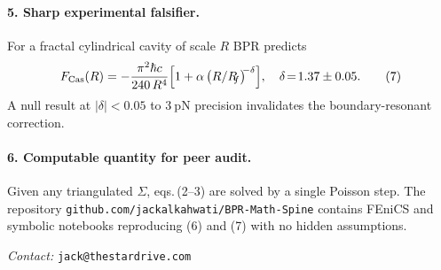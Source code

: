 \documentclass[11pt]{article}
\begin{document}
\paragraph{5. Sharp experimental falsifier.}
For a fractal cylindrical cavity of scale $R$ BPR predicts
\[
  F_{\text{Cas}}(R)
    = -\frac{\pi^2\hbar c}{240\,R^4}
      \Bigl[1+\alpha\,\bigl(R/R_{\!\!f}\bigr)^{\!\!-\delta}\Bigr],
  \quad\delta\!=\!1.37\pm0.05.                                     \tag{7}
\]
A null result at $|\delta|<0.05$ to $\SI{3}{\pico\newton}$ precision
invalidates the boundary-resonant correction.

\paragraph{6. Computable quantity for peer audit.}
Given any triangulated $\Sigma$, eqs.\,(2–3) are
solved by a single Poisson step.  The repository
\texttt{github.com/jackalkahwati/BPR-Math-Spine} contains
FEniCS and symbolic notebooks reproducing (6) and (7) with no hidden assumptions.

\vspace*{-12pt}
\begin{flushright}
\emph{Contact:} \texttt{jack@thestardrive.com}
\end{flushright}
\end{document}
